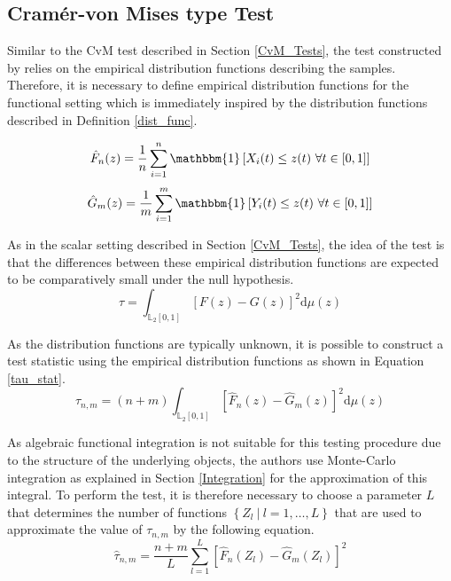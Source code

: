 \documentclass[12pt, a4paper]{article}
\theoremstyle{MAstyle} \newtheorem{assumption}{Assumption}[section]
\theoremstyle{MAstyle} \newtheorem{definition}{Definition}[section]
\theoremstyle{MAstyle} \newtheorem{theorem}{Theorem}[section]
\begin{document}
		\subsection{Cram\'{e}r-von Mises type Test}\label{cvm_type_test}
			Similar to the CvM test described in Section \ref{CvM_Tests}, the test constructed by \cite{bugni_permutation_2021} relies on the empirical distribution functions describing the samples. 
			Therefore, it is necessary to define empirical distribution functions for the functional setting which is immediately inspired by the distribution functions described in Definition \ref{dist_func}.
			\begin{multicols}{2}
				\noindent
				\begin{equation*}
					\hat{F}_n(z) = \frac{1}{n} \sum_{i = 1}^{n}\mathbbm{1}\left[X_i(t) \leq z(t) \ \forall t \in [0,1]\right]
				\end{equation*}
				\begin{equation}
					\hat{G}_m(z) = \frac{1}{m} \sum_{i = 1}^{m}\mathbbm{1}\left[Y_i(t) \leq z(t) \ \forall t \in [0,1]\right]
				\end{equation}
			\end{multicols}
			
			As in the scalar setting described in Section \ref{CvM_Tests}, the idea of the test is that the differences between these empirical distribution functions are expected to be comparatively small under the null hypothesis.
			\begin{equation}
				\tau = \int_{\mathbb{L}_2[0,1]}\left[F(z) - G(z)\right]^2 \mathrm{d} \mu(z)
			\end{equation}
			
			As the distribution functions are typically unknown, it is possible to construct a test statistic using the empirical distribution functions as shown in Equation \ref{tau_stat}.
			\begin{equation}\label{tau_stat}
				\tau_{n,m} = (n+m) \int_{\mathbb{L}_2[0,1]}\left[\hat{F}_n(z) - \hat{G}_m(z)\right]^2 \mathrm{d} \mu(z)
			\end{equation}
		
			As algebraic functional integration is not suitable for this testing procedure due to the structure of the underlying objects, the authors use Monte-Carlo integration as explained in Section \ref{Integration} for the approximation of this integral. To perform the test, it is therefore necessary to choose a parameter $L$ that determines the number of functions $\left\{Z_l \ \vert \ l = 1, \dots, L\right\}$ that are used to approximate the value of $\tau_{n,m}$ by the following equation.
			\begin{equation}\label{tau_hat}
				\hat{\tau}_{n,m} = \frac{n+m}{L} \sum_{l = 1}^{L} \left[\hat{F}_n(Z_l) - \hat{G}_m(Z_l)\right]^2
			\end{equation}
		
\end{document}
